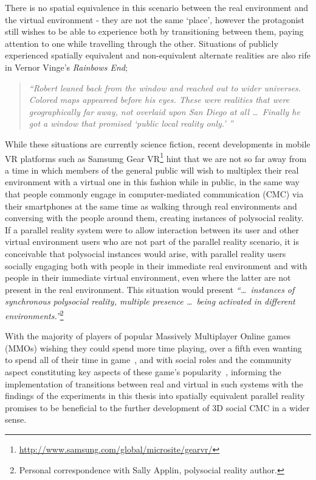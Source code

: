 There is no spatial equivalence in this scenario between the real environment and the virtual environment - they are not the same `place', however the protagonist still wishes to be able to experience both by transitioning between them, paying attention to one while travelling through the other. Situations of publicly experienced spatially equivalent and non-equivalent alternate realities are also rife in Vernor Vinge's \textit{Rainbows End};

\begin{quote}
	\textit{``Robert leaned back from the window and reached out to wider universes. Colored maps appeareed before his eyes. These were realities that were geographically far away, not overlaid upon San Diego at all \ldots\ Finally he got a window that promised `public local reality only.' ''}~\cite{Vinge2006}
\end{quote}

While these situations are currently science fiction, recent developments in mobile VR platforms such as Samsumg Gear VR\footnote{\url{http://www.samsung.com/global/microsite/gearvr/}} hint that we are not so far away from a time in which members of the general public will wish to multiplex their real environment with a virtual one in this fashion while in public, in the same way that people commonly engage in computer-mediated communication (CMC) via their smartphones at the same time as walking through real environments and conversing with the people around them, creating instances of polysocial reality. If a parallel reality system were to allow interaction between its user and other virtual environment users who are not part of the parallel reality scenario, it is conceivable that polysocial instances would arise, with parallel reality users socially engaging both with people in their immediate real environment and with people in their immediate virtual environment, even where the latter are not present in the real environment. This situation would present \textit{``\ldots\ instances of synchronous polysocial reality, multiple presence \ldots\ being activated in different environments.''}\footnote{Personal correspondence with Sally Applin, polysocial reality author.}

With the majority of players of popular Massively Multiplayer Online games (MMOs) wishing they could spend more time playing, over a fifth even wanting to spend all of their time in game~\cite{Castronova2006}, and with social roles and the community aspect constituting key aspects of these game's popularity~\cite{Castronova2006, Bartle2004}, informing the implementation of transitions between real and virtual in such systems with the findings of the experiments in this thesis into spatially equivalent parallel reality promises to be beneficial to the further development of 3D social CMC in a wider sense.

